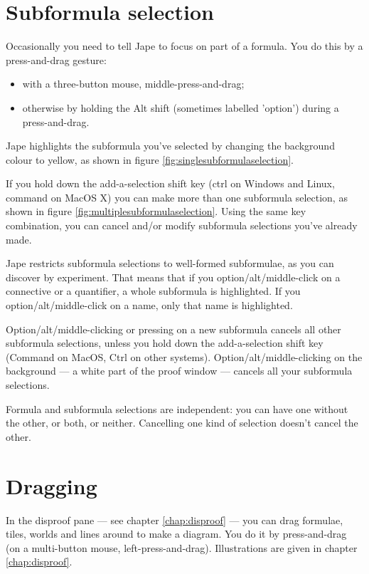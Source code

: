 \documentclass[11pt]{book}
\newcommand{\figref}[1]{figure \ref{fig:#1}}
\newcommand{\chapref}[1]{chapter \ref{chap:#1}}
\begin{document}
\section{Subformula selection}
\label{sec:subformulaselection}

Occasionally you need to tell Jape to focus on part of a formula. You do this by a press-and-drag gesture:
\begin{itemize}
\item with a three-button mouse, middle-press-and-drag;
\item otherwise by holding the Alt shift (sometimes labelled 'option') during a press-and-drag.
\end{itemize}

Jape highlights the subformula you've selected by changing the background colour to yellow, as shown in \figref{singlesubformulaselection}. 

If you hold down the add-a-selection shift key (ctrl on Windows and Linux, command on MacOS X) you can make more than one subformula selection, as shown in \figref{multiplesubformulaselection}. Using the same key combination, you can cancel and/or modify subformula selections you've already made.

Jape restricts subformula selections to well-formed subformulae, as you can discover by experiment. That means that if you option/alt/middle-click on a connective or a quantifier, a whole subformula is highlighted. If you option/alt/middle-click on a name, only that name is highlighted.

Option/alt/middle-clicking or pressing on a new subformula cancels all other subformula selections, unless you hold down the add-a-selection shift key (Command on MacOS, Ctrl on other systems). Option/alt/middle-clicking on the background --- a white part of the proof window --- cancels all your subformula selections.

Formula and subformula selections are independent: you can have one without the other, or both, or neither. Cancelling one kind of selection doesn't cancel the other. 

\section{Dragging}

In the disproof pane --- see \chapref{disproof} --- you can drag formulae, tiles, worlds and lines around to make a diagram. You do it by press-and-drag (on a multi-button mouse, left-press-and-drag). Illustrations are given in \chapref{disproof}.
\end{document}
